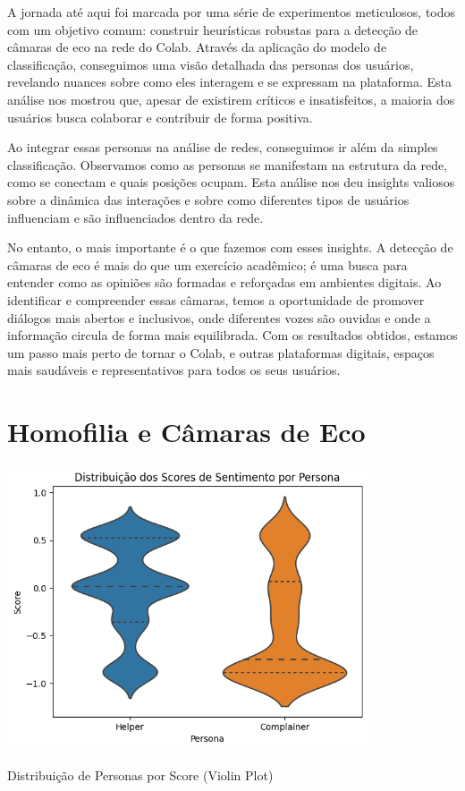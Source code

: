 A jornada até aqui foi marcada por uma série de experimentos meticulosos, todos com um objetivo comum: construir heurísticas robustas para a detecção de câmaras de eco na rede do Colab. Através da aplicação do modelo de classificação, conseguimos uma visão detalhada das personas dos usuários, revelando nuances sobre como eles interagem e se expressam na plataforma. Esta análise nos mostrou que, apesar de existirem críticos e insatisfeitos, a maioria dos usuários busca colaborar e contribuir de forma positiva.

Ao integrar essas personas na análise de redes, conseguimos ir além da simples classificação. Observamos como as personas se manifestam na estrutura da rede, como se conectam e quais posições ocupam. Esta análise nos deu insights valiosos sobre a dinâmica das interações e sobre como diferentes tipos de usuários influenciam e são influenciados dentro da rede.

No entanto, o mais importante é o que fazemos com esses insights. A detecção de câmaras de eco é mais do que um exercício acadêmico; é uma busca para entender como as opiniões são formadas e reforçadas em ambientes digitais. Ao identificar e compreender essas câmaras, temos a oportunidade de promover diálogos mais abertos e inclusivos, onde diferentes vozes são ouvidas e onde a informação circula de forma mais equilibrada. Com os resultados obtidos, estamos um passo mais perto de tornar o Colab, e outras plataformas digitais, espaços mais saudáveis e representativos para todos os seus usuários.

\section{Homofilia e Câmaras de Eco}

\begin{quadro}[htb]
    \centering
    \includegraphics[width=0.8\textwidth]{images/personas_violin.png}
    \caption{Distribuição de Personas por Score (Violin Plot)}
    \label{fig:personas_violin}
\end{quadro}

